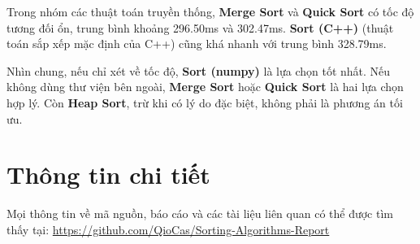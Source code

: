 \documentclass[12pt]{article}
\begin{document}
Trong nhóm các thuật toán truyền thống, \textbf{Merge Sort} và \textbf{Quick Sort} có tốc độ tương đối ổn, trung bình khoảng 296.50ms và 302.47ms. \textbf{Sort (C++)} (thuật toán sắp xếp mặc định của C++) cũng khá nhanh với trung bình 328.79ms.

Nhìn chung, nếu chỉ xét về tốc độ, \textbf{Sort (numpy)} là lựa chọn tốt nhất. Nếu không dùng thư viện bên ngoài, \textbf{Merge Sort} hoặc \textbf{Quick Sort} là hai lựa chọn hợp lý. Còn \textbf{Heap Sort}, trừ khi có lý do đặc biệt, không phải là phương án tối ưu.

\section{Thông tin chi tiết}

\noindent Mọi thông tin về mã nguồn, báo cáo và các tài liệu liên quan có thể được tìm thấy tại:  
\noindent\url{https://github.com/QioCas/Sorting-Algorithms-Report}
\end{document}
